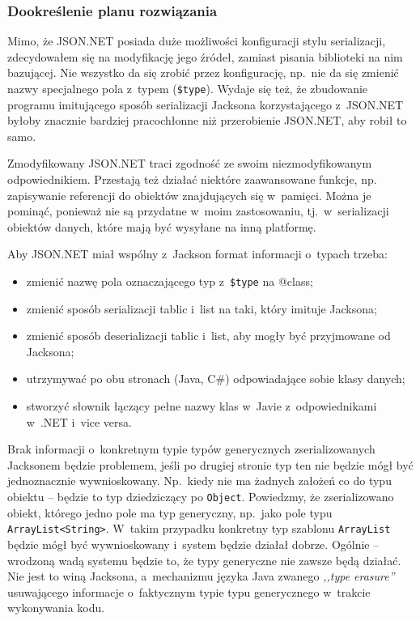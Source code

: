 \subsubsection{Dookreślenie planu rozwiązania}
Mimo, że JSON.NET posiada duże możliwości konfiguracji stylu serializacji, zdecydowałem się na modyfikację jego źródeł, zamiast pisania biblioteki na nim bazującej. Nie wszystko da się zrobić przez konfigurację, np.\ nie da się zmienić nazwy specjalnego pola z~typem (\texttt{\$type}).
Wydaje się też, że zbudowanie programu imitującego sposób serializacji Jacksona korzystającego z~JSON.NET byłoby znacznie bardziej pracochłonne niż przerobienie JSON.NET, aby robił to samo.

Zmodyfikowany JSON.NET traci zgodność ze swoim niezmodyfikowanym odpowiednikiem.
Przestają też działać niektóre zaawansowane funkcje, np. zapisywanie referencji do obiektów znajdujących się w~pamięci.
Można je pominąć, ponieważ nie są przydatne w~moim zastosowaniu, tj.\ w~serializacji obiektów danych, które mają być wysyłane na inną platformę.

Aby JSON.NET miał wspólny z~Jackson format informacji o~typach trzeba:
\begin{itemize}
	\item zmienić nazwę pola oznaczającego typ z~\texttt{\$type} na @class;
	\item zmienić sposób serializacji tablic i~list na taki, który imituje Jacksona;
	\item zmienić sposób deserializacji tablic i~list, aby mogły być przyjmowane od Jacksona;
	\item utrzymywać po obu stronach (Java, C\#) odpowiadające sobie klasy danych;
	\item stworzyć słownik łączący pełne nazwy klas w~Javie z~odpowiednikami w~.NET i~vice versa.
\end{itemize}

Brak informacji o~konkretnym typie typów generycznych zserializowanych Jacksonem będzie problemem, jeśli po drugiej stronie typ ten nie będzie mógł być jednoznacznie wywnioskowany. Np.\ kiedy nie ma żadnych założeń co do typu obiektu -- będzie to typ dziedziczący po \texttt{Object}.
Powiedzmy, że zserializowano obiekt, którego jedno pole ma typ generyczny, np.\ jako pole typu \texttt{ArrayList<String>}. W~takim przypadku konkretny typ szablonu \texttt{ArrayList} będzie mógł być wywnioskowany i~system będzie działał dobrze.
Ogólnie -- wrodzoną wadą systemu będzie to, że typy generyczne nie zawsze będą działać.
Nie jest to winą Jacksona, a~mechanizmu języka Java zwanego \emph{,,type erasure''} usuwającego informacje o~faktycznym typie typu generycznego w~trakcie wykonywania kodu.

